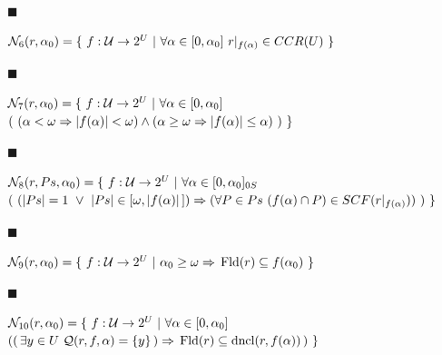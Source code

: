  
 
\par\noindent  $\blacksquare$ 
 
$\mathcal{N}_{6}(r,\alpha_{0})=\{\leavevmode\nobreak\ f:\mathcal{U}\to 2^{U}%
\leavevmode\nobreak\ |\leavevmode\nobreak\ \forall\alpha\in[0,\alpha_{0}]%
\leavevmode\nobreak\ r|_{f(\alpha)}\in CCR(U)\leavevmode\nobreak\ \}$\par
 
 
 
\par\noindent  $\blacksquare$ 
 
$\mathcal{N}_{7}(r,\alpha_{0})=\{\leavevmode\nobreak\ f:\mathcal{U}\to 2^{U}%
\leavevmode\nobreak\ |\leavevmode\nobreak\ \forall\alpha\in[0,\alpha_{0}]%
\leavevmode\nobreak\ $  $(\leavevmode\nobreak\ (\alpha<\omega\Rightarrow|f(\alpha)|<\omega)\wedge(%
\alpha\geq\omega\Rightarrow|f(\alpha)|\leq\alpha)\leavevmode\nobreak\ )%
\leavevmode\nobreak\ \}$\par
 
 
 
\par\noindent  $\blacksquare$ 
 
$\mathcal{N}_{8}(r,Ps,\alpha_{0})=\{\leavevmode\nobreak\ f:\mathcal{U}\to 2^{U}%
\leavevmode\nobreak\ |\leavevmode\nobreak\ \forall\alpha\in[0,\alpha_{0}]_{0S}%
\leavevmode\nobreak\ $  $(\leavevmode\nobreak\ (|Ps|=1\leavevmode\nobreak\ \vee\leavevmode\nobreak\ |Ps%
|\in[\omega,|f(\alpha)|\,])\Rightarrow(\forall P\in Ps\leavevmode\nobreak\ (f(%
\alpha)\cap P)\in SCF(r|_{f(\alpha)}))\leavevmode\nobreak\ )\leavevmode%
\nobreak\ \}$\par
 
 
 
\par\noindent  $\blacksquare$ 
 
$\mathcal{N}_{9}(r,\alpha_{0})=\{\leavevmode\nobreak\ f:\mathcal{U}\to 2^{U}%
\leavevmode\nobreak\ |\leavevmode\nobreak\ \alpha_{0}\geq\omega\Rightarrow\,%
\mathrm{Fld}(r)\subseteq f(\alpha_{0})\leavevmode\nobreak\ \}$\par
 
 
 
\par\noindent  $\blacksquare$ 
 
$\mathcal{N}_{10}(r,\alpha_{0})=\{\leavevmode\nobreak\ f:\mathcal{U}\to 2^{U}%
\leavevmode\nobreak\ |\leavevmode\nobreak\ \forall\alpha\in[0,\alpha_{0}]$  $((\,\exists y\in U\leavevmode\nobreak\ \mathcal{Q}(r,f,\alpha)=\{y\}\,)%
\Rightarrow\,\mathrm{Fld}(r)\subseteq\mathrm{dncl}(r,f(\alpha))\,)\leavevmode%
\nobreak\ \}$\par
 
